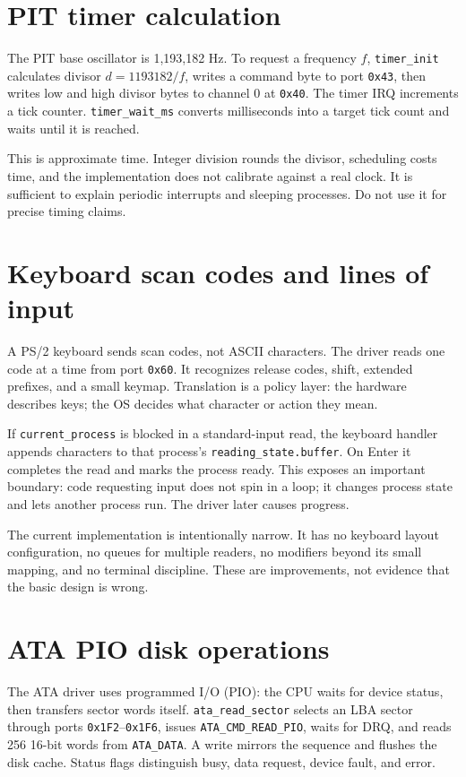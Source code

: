 \section{PIT timer calculation}
The PIT base oscillator is 1,193,182 Hz. To request a frequency \(f\), \texttt{timer\_init} calculates divisor \(d = 1193182 / f\), writes a command byte to port \texttt{0x43}, then writes low and high divisor bytes to channel 0 at \texttt{0x40}. The timer IRQ increments a tick counter. \texttt{timer\_wait\_ms} converts milliseconds into a target tick count and waits until it is reached.

This is approximate time. Integer division rounds the divisor, scheduling costs time, and the implementation does not calibrate against a real clock. It is sufficient to explain periodic interrupts and sleeping processes. Do not use it for precise timing claims.

\section{Keyboard scan codes and lines of input}
A PS/2 keyboard sends scan codes, not ASCII characters. The driver reads one code at a time from port \texttt{0x60}. It recognizes release codes, shift, extended prefixes, and a small keymap. Translation is a policy layer: the hardware describes keys; the OS decides what character or action they mean.

If \texttt{current\_process} is blocked in a standard-input read, the keyboard handler appends characters to that process's \texttt{reading\_state.buffer}. On Enter it completes the read and marks the process ready. This exposes an important boundary: code requesting input does not spin in a loop; it changes process state and lets another process run. The driver later causes progress.

The current implementation is intentionally narrow. It has no keyboard layout configuration, no queues for multiple readers, no modifiers beyond its small mapping, and no terminal discipline. These are improvements, not evidence that the basic design is wrong.

\section{ATA PIO disk operations}
The ATA driver uses programmed I/O (PIO): the CPU waits for device status, then transfers sector words itself. \texttt{ata\_read\_sector} selects an LBA sector through ports \texttt{0x1F2}--\texttt{0x1F6}, issues \texttt{ATA\_CMD\_READ\_PIO}, waits for DRQ, and reads 256 16-bit words from \texttt{ATA\_DATA}. A write mirrors the sequence and flushes the disk cache. Status flags distinguish busy, data request, device fault, and error.

